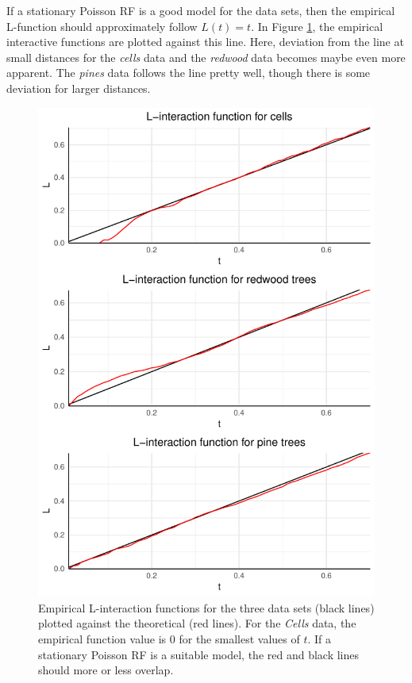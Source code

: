 If a stationary Poisson RF is a good model for the data sets, then the empirical L-function should approximately follow $L(t) = t$. In Figure \ref{fig:L_emp_theor}, the empirical interactive functions are plotted against this line. Here, deviation from the line at small distances for the \textit{cells} data and the \textit{redwood} data becomes maybe even more apparent. The \textit{pines} data follows the line pretty well, though there is some deviation for larger distances. 

\begin{figure}
    \centering
    \includegraphics[scale=0.95]{figures/prob1_L_emp_theor.pdf}
    \caption{Empirical L-interaction functions for the three data sets (black lines) plotted against the theoretical (red lines). For the \textit{Cells} data, the empirical function value is $0$ for the smallest values of $t$. If a stationary Poisson RF is a suitable model, the red and black lines should more or less overlap.}
    \label{fig:L_emp_theor}
\end{figure}

